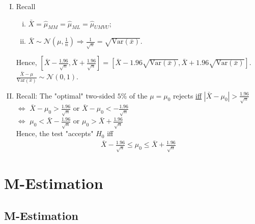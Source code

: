 \documentclass[11pt]{elegantbook}
\begin{document}
\begin{enumerate}[(I).]
    \item Recall
    \begin{enumerate}[(i).]
        \item $\bar{X}=\hat{\mu}_{MM}=\hat{\mu}_{ML}=\hat{\mu}_{UMVU}$;
        \item $\bar{X}\sim \mathcal{N}(\mu,\frac{1}{n}) \Rightarrow \frac{1}{\sqrt{n}}=\sqrt{\text{Var}(\bar{x})}$.
    \end{enumerate}
    Hence, $\left[\bar{X}-\frac{1.96}{\sqrt{n}},\bar{X}+\frac{1.96}{\sqrt{n}}\right]=\left[\bar{X}-1.96\sqrt{\text{Var}(\bar{x})},\bar{X}+1.96\sqrt{\text{Var}(\bar{x})}\right]$. $\frac{\bar{X}-\mu}{\text{Var}(\bar{x})}\sim \mathcal{N}(0,1)$.
    \item Recall: The "optimal" two-sided $5\%$ of the $\mu=\mu_0$ rejects \underline{iff} $|\bar{X}-\mu_0|>\frac{1.96}{\sqrt{n}}$\\
    $\Leftrightarrow$ $\bar{X}-\mu_0>\frac{1.96}{\sqrt{n}}$ or $\bar{X}-\mu_0<-\frac{1.96}{\sqrt{n}}$\\
    $\Leftrightarrow$ $\mu_0<\bar{X}-\frac{1.96}{\sqrt{n}}$ or $\mu_0>\bar{X}+\frac{1.96}{\sqrt{n}}$\\
    Hence, the test "accepts" $H_0$ iff
    \begin{equation}
        \begin{aligned}
            \bar{X}-\frac{1.96}{\sqrt{n}}\leq \mu_0\leq \bar{X}+\frac{1.96}{\sqrt{n}}
        \end{aligned}
        \nonumber
    \end{equation}
\end{enumerate}



\chapter{M-Estimation}
\section{M-Estimation}\label{section:m-estimation}
\end{document}
